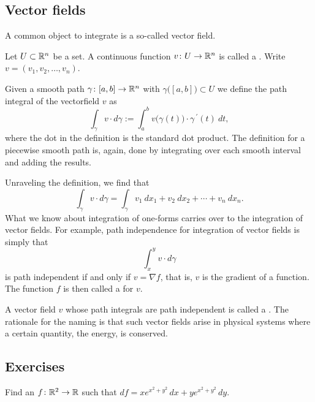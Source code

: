 \subsection{Vector fields}

A common object to integrate is a so-called vector field.

\begin{defn}
Let $U \subset {\mathbb{R}}^n$ be a set.
A continuous function $v \colon U \to {\mathbb{R}}^n$ is called a
\emph{}.  Write $v = (v_1,v_2,\ldots,v_n)$.

Given a smooth path $\gamma \colon [a,b] \to {\mathbb{R}}^n$ with
$\gamma\bigl([a,b]\bigr) \subset U$ we define
the path integral of the vectorfield $v$ as
\begin{equation*}
\int_{\gamma} v \cdot d\gamma
:=
\int_a^b v\bigl(\gamma(t)\bigr) \cdot \gamma^{\:\prime}(t) ~ dt ,
\end{equation*}
where the dot in the definition is the standard dot product.
The definition for a piecewise smooth path is, again, done by integrating over
each smooth interval and adding the results.
\end{defn}

Unraveling the definition, we find that
\begin{equation*}
\int_{\gamma} v \cdot d\gamma
=
\int_{\gamma} v_1 ~dx_1 + v_2 ~dx_2 + \cdots + v_n ~dx_n .
\end{equation*}
What we know about integration of
one-forms carries over to the integration of vector fields.
For example, path independence for integration of vector fields is simply
that
\begin{equation*}
\int_x^y v \cdot d\gamma
\end{equation*}
is path independent if and only if 
$v = \nabla f$, that is, $v$ is the gradient of a function.  The function $f$
is then called a \emph{} for $v$.

A vector field $v$ whose path integrals are path independent is called
a \emph{}.  The rationale for the naming
is that such vector fields arise in physical systems
where a certain quantity, the energy, is conserved.

\subsection{Exercises}

\begin{exercise}
Find an $f \colon {\mathbb{R}}^2 \to {\mathbb{R}}$ such that $df = xe^{x^2+y^2}\, dx +
ye^{x^2+y^2} \, dy$.
\end{exercise}

